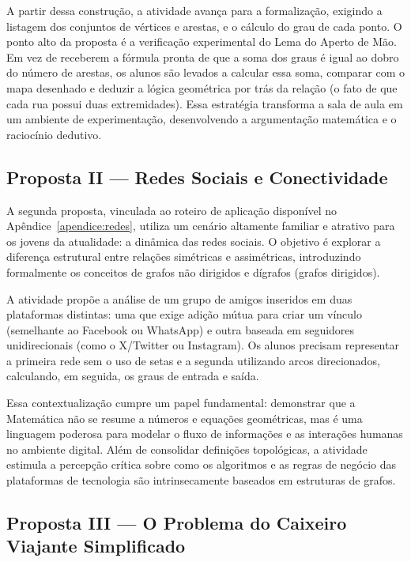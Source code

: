 \documentclass[
  12pt,
  oneside,
  a4paper,
  english,
  brazilian
  ]{abntex2}
\theoremstyle{definition}
\begin{document}
A partir dessa construção, a atividade avança para a formalização, exigindo a listagem dos conjuntos de vértices e arestas, e o cálculo do grau de cada ponto. O ponto alto da proposta é a verificação experimental do Lema do Aperto de Mão. Em vez de receberem a fórmula pronta de que a soma dos graus é igual ao dobro do número de arestas, os alunos são levados a calcular essa soma, comparar com o mapa desenhado e deduzir a lógica geométrica por trás da relação (o fato de que cada rua possui duas extremidades). Essa estratégia transforma a sala de aula em um ambiente de experimentação, desenvolvendo a argumentação matemática e o raciocínio dedutivo.

\subsection{Proposta II --- Redes Sociais e Conectividade}
\label{sub:proposta_redes}

A segunda proposta, vinculada ao roteiro de aplicação disponível no Apêndice~\ref{apendice:redes}, utiliza um cenário altamente familiar e atrativo para os jovens da atualidade: a dinâmica das redes sociais. O objetivo é explorar a diferença estrutural entre relações simétricas e assimétricas, introduzindo formalmente os conceitos de grafos não dirigidos e dígrafos (grafos dirigidos).

A atividade propõe a análise de um grupo de amigos inseridos em duas plataformas distintas: uma que exige adição mútua para criar um vínculo (semelhante ao Facebook ou WhatsApp) e outra baseada em seguidores unidirecionais (como o X/Twitter ou Instagram). Os alunos precisam representar a primeira rede sem o uso de setas e a segunda utilizando arcos direcionados, calculando, em seguida, os graus de entrada e saída.

Essa contextualização cumpre um papel fundamental: demonstrar que a Matemática não se resume a números e equações geométricas, mas é uma linguagem poderosa para modelar o fluxo de informações e as interações humanas no ambiente digital. Além de consolidar definições topológicas, a atividade estimula a percepção crítica sobre como os algoritmos e as regras de negócio das plataformas de tecnologia são intrinsecamente baseados em estruturas de grafos.

\subsection{Proposta III --- O Problema do Caixeiro Viajante Simplificado}
\label{sub:proposta_caixeiro}
\end{document}
